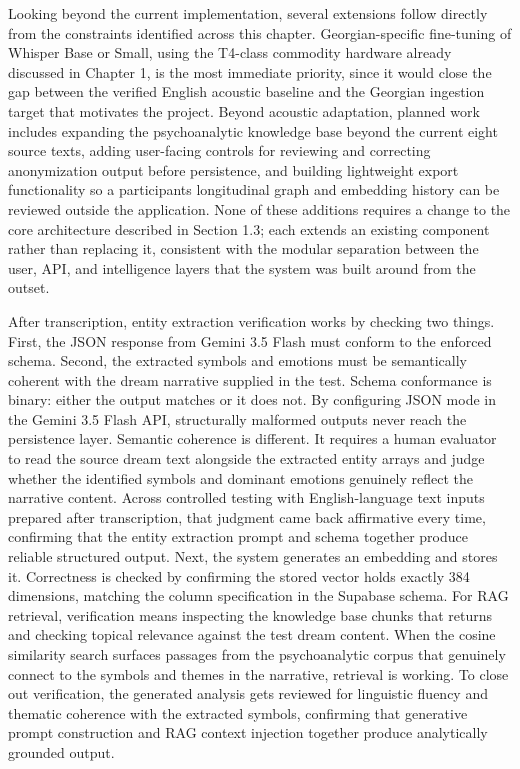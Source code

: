 \documentclass[12pt,a4paper]{report}
\DeclareRobustCommand{\code}[1]{\texttt{\detokenize{#1}}}
\begin{document}
Looking beyond the current implementation, several extensions follow directly from the constraints identified across this chapter. Georgian-specific fine-tuning of Whisper Base or Small, using the T4-class commodity hardware already discussed in Chapter 1, is the most immediate priority, since it would close the gap between the verified English acoustic baseline and the Georgian ingestion target that motivates the project. Beyond acoustic adaptation, planned work includes expanding the psychoanalytic knowledge base beyond the current eight source texts, adding user-facing controls for reviewing and correcting anonymization output before persistence, and building lightweight export functionality so a participant\textquotesingle{}s longitudinal graph and embedding history can be reviewed outside the application. None of these additions requires a change to the core architecture described in Section 1.3; each extends an existing component rather than replacing it, consistent with the modular separation between the user, API, and intelligence layers that the system was built around from the outset.

After transcription, entity extraction verification works by checking two things. First, the JSON response from Gemini 3.5 Flash must conform to the enforced schema. Second, the extracted symbols and emotions must be semantically coherent with the dream narrative supplied in the test. Schema conformance is binary: either the output matches or it does not. By configuring JSON mode in the Gemini 3.5 Flash API, structurally malformed outputs never reach the persistence layer. Semantic coherence is different. It requires a human evaluator to read the source dream text alongside the extracted entity arrays and judge whether the identified symbols and dominant emotions genuinely reflect the narrative content. Across controlled testing with English-language text inputs prepared after transcription, that judgment came back affirmative every time, confirming that the entity extraction prompt and schema together produce reliable structured output. Next, the system generates an embedding and stores it. Correctness is checked by confirming the stored vector holds exactly 384 dimensions, matching the \code{vector(384)} column specification in the Supabase \code{pgvector} schema. For RAG retrieval, verification means inspecting the knowledge base chunks that \code{match_documents} returns and checking topical relevance against the test dream content. When the cosine similarity search surfaces passages from the psychoanalytic corpus that genuinely connect to the symbols and themes in the narrative, retrieval is working. To close out verification, the generated analysis gets reviewed for linguistic fluency and thematic coherence with the extracted symbols, confirming that generative prompt construction and RAG context injection together produce analytically grounded output.
\end{document}

